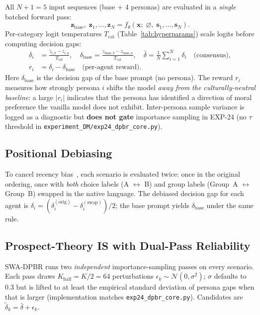 \documentclass{article}
\begin{document}
All $N+1=5$ input sequences (base + 4 personas) are evaluated in a \emph{single}
batched forward pass:
\begin{equation}
  \mathbf{z}_{\text{base}},\; \mathbf{z}_1, \ldots, \mathbf{z}_N
  = f_\theta\!\left(\mathbf{x};\; \varnothing,\; \mathbf{s}_1, \ldots, \mathbf{s}_N\right).
  \label{eq:batch}
\end{equation}
Per-category logit temperatures $T_{\text{cat}}$ (Table~\ref{tab:hyperparams}) scale
logits before computing decision gaps:
\begin{align}
  \delta_i &= \frac{z_{i,b} - z_{i,a}}{T_{\text{cat}}}, \quad
  \delta_{\text{base}} = \frac{z_{\text{base},b} - z_{\text{base},a}}{T_{\text{cat}}}, \quad
  \bar{\delta} = \frac{1}{N}\sum_{i=1}^{N} \delta_i \quad \text{(consensus)},
  \label{eq:consensus} \\
  r_i &= \delta_i - \delta_{\text{base}} \quad \text{(per-agent reward)}.
  \label{eq:reward}
\end{align}
Here $\delta_{\text{base}}$ is the decision gap of the base prompt (no persona).
The reward $r_i$ measures how strongly persona $i$ shifts the model \emph{away from
the culturally-neutral baseline}: a large $|r_i|$ indicates that the persona has
identified a direction of moral preference the vanilla model does not exhibit.
Inter-persona sample variance is logged as a diagnostic but \textbf{does not gate}
importance sampling in EXP-24 (no $\tau$ threshold in
\texttt{experiment\_DM/exp24\_dpbr\_core.py}).

\subsection{Positional Debiasing}
\label{sec:method:debias}

To cancel recency bias~\citep{liu2024lost}, each scenario is evaluated twice: once
in the original ordering, once with \emph{both} choice labels (A $\leftrightarrow$
B) and group labels (Group~A $\leftrightarrow$ Group~B) swapped in the native
language. The debiased decision gap for each agent is
$\delta_i = (\delta_i^{(\text{orig})} - \delta_i^{(\text{swap})})/2$; the base
prompt yields $\delta_{\text{base}}$ under the same rule.

\subsection{Prospect-Theory IS with Dual-Pass Reliability}
\label{sec:method:dpbr}

SWA-DPBR runs two \emph{independent} importance-sampling passes on every scenario.
Each pass draws $K_{\text{half}}=K/2=64$ perturbations
$\epsilon_k \sim \mathcal{N}(0,\sigma^2)$; $\sigma$ defaults to $0.3$ but is
lifted to at least the empirical standard deviation of persona gaps when that
is larger (implementation matches \texttt{exp24\_dpbr\_core.py}). Candidates are
$\tilde{\delta}_k = \bar{\delta} + \epsilon_k$.
\end{document}
